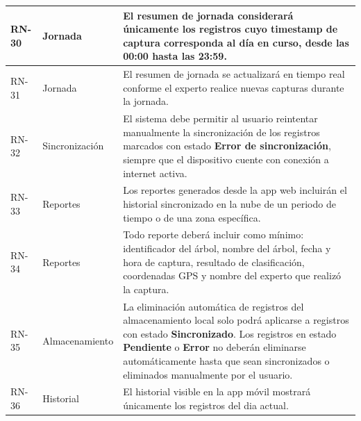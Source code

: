 \begin{longtable}{|>{\centering\arraybackslash}m{1.8cm}|>{\centering\arraybackslash}m{2.5cm}|m{9.5cm}|}
\hline
RN-30 & Jornada & El resumen de jornada considerará únicamente los registros cuyo timestamp de captura corresponda al día en curso, desde las 00:00 hasta las 23:59. \\
\hline
RN-31 & Jornada & El resumen de jornada se actualizará en tiempo real conforme el experto realice nuevas capturas durante la jornada. \\
\hline
RN-32 & Sincronización & El sistema debe permitir al usuario reintentar manualmente la sincronización de los registros marcados con estado \textbf{Error de sincronización}, siempre que el dispositivo cuente con conexión a internet activa. \\
\hline
RN-33 & Reportes & Los reportes generados desde la app web incluirán el historial sincronizado en la nube de un periodo de tiempo o de una zona específica. \\
\hline
RN-34 & Reportes & Todo reporte deberá incluir como mínimo: identificador del árbol, nombre del árbol, fecha y hora de captura, resultado de clasificación, coordenadas GPS y nombre del experto que realizó la captura. \\
\hline
RN-35 & Almacenamiento & La eliminación automática de registros del almacenamiento local solo podrá aplicarse a registros con estado \textbf{Sincronizado}. Los registros en estado \textbf{Pendiente} o \textbf{Error} no deberán eliminarse automáticamente hasta que sean sincronizados o eliminados manualmente por el usuario. \\
\hline






RN-36 & Historial & El historial visible en la app móvil mostrará únicamente los registros del dia actual. \\
\hline









\end{longtable}
